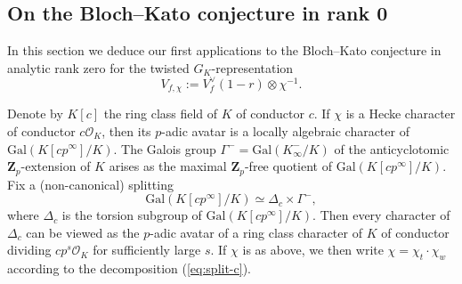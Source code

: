 \documentclass[10pt,letterpaper]{amsart}
\theoremstyle{plain}
\theoremstyle{definition}
\theoremstyle{definition}
\theoremstyle{plain}
\theoremstyle{plain}
\theoremstyle{plain}
\theoremstyle{remark}
\newtheorem{rem}[thm]{Remark}
\numberwithin{equation}{section}
\newcommand{\pp}{\mathfrak{p}}
\def\cO{\mathcal O}
\newcommand{\unb}{{\boldsymbol{f}}}
\newcommand{\Z}{\mathbf{Z}}
\newcommand{\bff}{{\boldsymbol{f}}}
\newcommand{\bfg}{{\boldsymbol{g}}}
\newcommand{\bfh}{{\boldsymbol{h}}}
\begin{document}


\subsection{On the Bloch--Kato conjecture in rank 0}
\label{subsec:BK-def}

In this section we deduce our first applications to the Bloch--Kato conjecture in analytic rank zero for the twisted $G_K$-representation
\[
V_{f,\chi}:=V_f^\vee(1-r)\otimes\chi^{-1}.
\]

Denote by $K[c]$ the ring class field of $K$ of conductor $c$. %
If $\chi$ is a Hecke character of conductor $c\cO_K$, then its $p$-adic avatar is a locally algebraic character of ${\mathrm{Gal}}(K[cp^\infty]/K)$. The Galois group $\Gamma^-={\mathrm{Gal}}(K_\infty^-/K)$ of the anticyclotomic $\Z_p$-extension of $K$ arises as the maximal $\Z_p$-free quotient of ${\mathrm{Gal}}(K[cp^\infty]/K)$. Fix a (non-canonical) splitting
\begin{equation}\label{eq:split-c}
{\mathrm{Gal}}(K[cp^\infty]/K)\simeq\Delta_c\times\Gamma^-,
\end{equation}
where $\Delta_c$ is the torsion subgroup of ${\mathrm{Gal}}(K[cp^\infty]/K)$. Then every character of $\Delta_c$ can be viewed as the $p$-adic avatar of a ring class character of $K$ of conductor dividing $cp^s\cO_K$ for sufficiently large $s$. If $\chi$ is as above, we then write $\chi=\chi_t\cdot\chi_{w}$ according to the decomposition (\ref{eq:split-c}).
 
\end{document}
